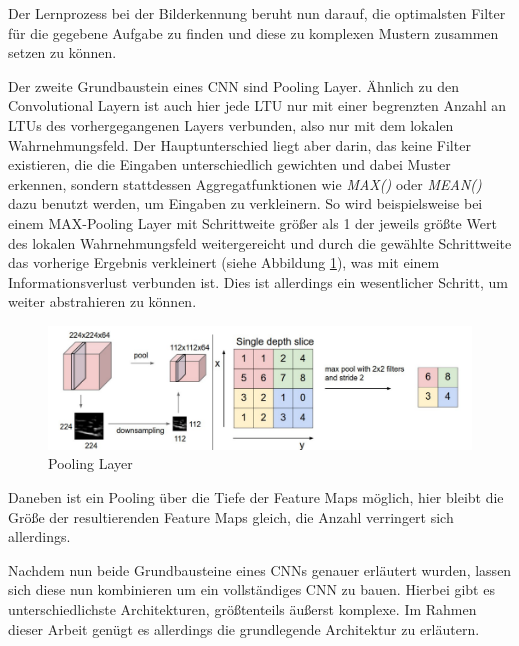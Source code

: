 Der Lernprozess bei der Bilderkennung beruht nun darauf, die optimalsten Filter für die gegebene Aufgabe zu finden und diese zu komplexen Mustern zusammen setzen zu können. \cite[S. 363 f.]{AurelienGeron.2018}

Der zweite Grundbaustein eines CNN sind Pooling Layer. Ähnlich zu den Convolutional Layern ist auch hier jede LTU nur mit einer begrenzten Anzahl an LTUs des vorhergegangenen Layers verbunden, also nur mit dem lokalen Wahrnehmungsfeld. Der Hauptunterschied liegt aber darin, das keine Filter existieren, die die Eingaben unterschiedlich gewichten und dabei Muster erkennen, sondern stattdessen Aggregatfunktionen wie \textit{MAX()} oder \textit{MEAN()} dazu benutzt werden, um Eingaben zu verkleinern. So wird beispielsweise bei einem MAX-Pooling Layer mit Schrittweite größer als 1 der jeweils größte Wert des lokalen Wahrnehmungsfeld weitergereicht und durch die gewählte Schrittweite das vorherige Ergebnis verkleinert (siehe Abbildung \ref{pooling_layer}), was mit einem Informationsverlust verbunden ist. Dies ist allerdings ein wesentlicher Schritt, um weiter abstrahieren zu können. \cite[S. 369 f.]{AurelienGeron.2018}

\begin{figure}[ht]
	\begin{center}
		\includegraphics[width=15cm]{Bilder/pooling_layer.png} 
		\caption[Pooling Layer]{Pooling Layer \cite{LeonadroAraujoSantos.2018}}
		\label{pooling_layer}
	\end{center}
\end{figure}

Daneben ist ein Pooling über die Tiefe der Feature Maps möglich, hier bleibt die Größe der resultierenden Feature Maps gleich, die Anzahl verringert sich allerdings. \cite[S. 370]{AurelienGeron.2018}

Nachdem nun beide Grundbausteine eines CNNs genauer erläutert wurden, lassen sich diese nun kombinieren um ein vollständiges CNN zu bauen. Hierbei gibt es unterschiedlichste Architekturen, größtenteils äußerst komplexe. Im Rahmen dieser Arbeit genügt es allerdings die grundlegende Architektur zu erläutern.

